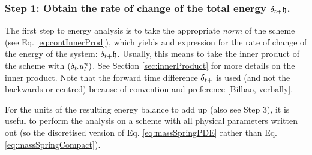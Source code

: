 {{%


\subsubsection{Step 1: Obtain the rate of change of the total energy $\delta_{t+} \mathfrak{h}$.}
The first step to energy analysis is to take the appropriate \textit{norm} of the scheme (see Eq. \eqref{eq:contInnerProd}), which yields and expression for the rate of change of the energy of the system: $\delta_{t+}\mathfrak{h}$. Usually, this means to take the inner product of the scheme with $(\delta_{t\cdot} u_l^n)$. See Section \ref{sec:innerProduct} for more details on the inner product. Note that the forward time difference $\delta_{t+}$ is used (and not the backwards or centred) because of convention and preference [Bilbao, verbally].

For the units of the resulting energy balance to add up (also see Step 3), it is useful to perform the analysis on a scheme with all physical parameters written out (so the discretised version of Eq. \eqref{eq:massSpringPDE} rather than Eq. \eqref{eq:massSpringCompact}).

}}
